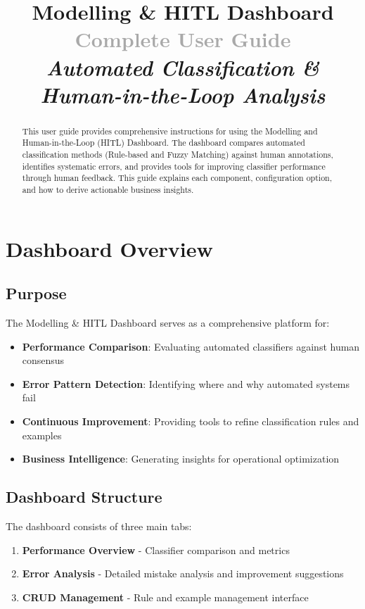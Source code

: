 \documentclass[11pt,a4paper]{article}
\title{
    \vspace{-1cm}
    {\Huge\textbf{\textcolor{primaryblue}{Modelling \& HITL Dashboard}}}\\
    {\Large\textcolor{darkgray}{Complete User Guide}}\\
    \vspace{0.5cm}
    {\normalsize\textit{Automated Classification \& Human-in-the-Loop Analysis}}
}
\author{}
\date{}
\begin{document}
\maketitle
\thispagestyle{empty}

\vspace{1cm}

\begin{abstract}
This user guide provides comprehensive instructions for using the Modelling and Human-in-the-Loop (HITL) Dashboard. The dashboard compares automated classification methods (Rule-based and Fuzzy Matching) against human annotations, identifies systematic errors, and provides tools for improving classifier performance through human feedback. This guide explains each component, configuration option, and how to derive actionable business insights.
\end{abstract}

\tableofcontents
\newpage

\section{Dashboard Overview}

\subsection{Purpose}
The Modelling \& HITL Dashboard serves as a comprehensive platform for:
\begin{itemize}
    \item \textbf{Performance Comparison}: Evaluating automated classifiers against human consensus
    \item \textbf{Error Pattern Detection}: Identifying where and why automated systems fail
    \item \textbf{Continuous Improvement}: Providing tools to refine classification rules and examples
    \item \textbf{Business Intelligence}: Generating insights for operational optimization
\end{itemize}

\subsection{Dashboard Structure}
The dashboard consists of three main tabs:
\begin{enumerate}
    \item \textcolor{primaryblue}{\textbf{Performance Overview}} - Classifier comparison and metrics
    \item \textcolor{primaryblue}{\textbf{Error Analysis}} - Detailed mistake analysis and improvement suggestions
    \item \textcolor{primaryblue}{\textbf{CRUD Management}} - Rule and example management interface
\end{enumerate}
\end{document}
